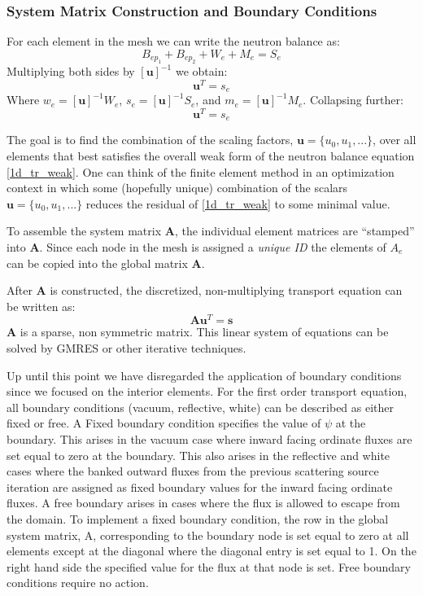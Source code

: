 \subsubsection{System Matrix Construction and Boundary Conditions}

For each element in the mesh we can write the neutron balance as:
\begin{equation}
B_{ep_1} + B_{ep_2} + W_e + M_e = S_e
\end{equation}
Multiplying both sides by $[\mathbf u]^{-1}$ we obtain:
\begin{equation}
[b_{ep_1} + b_{ep_2} + w_e + m_e] \mathbf u^T = s_e
\end{equation}
Where $w_e= [\mathbf u]^{-1}W_e $, $s_e=[\mathbf u]^{-1} S_e $, and $m_e=[\mathbf u]^{-1}M_e $.  Collapsing further:
\begin{equation}
[A_e] \mathbf u^T = s_e
\end{equation}

The goal is to find the combination of the scaling factors, $\mathbf u=\{u_0, u_1, ...\}$, over all elements that best satisfies the overall weak form of the neutron balance equation \ref{1d_tr_weak}.  One can think of the finite element method in an optimization context in which some (hopefully unique) combination of the scalars $\mathbf u =\{u_0, u_1, ...\}$ reduces the residual of \ref{1d_tr_weak} to some minimal value.
 
 To assemble the system matrix $\mathbf A$, the individual element matrices are ``stamped'' into $\mathbf A$. Since
each node in the mesh is assigned a \emph{unique ID} the elements of $A_e$ can be copied into the global matrix $\mathbf A$.

After $\mathbf A$ is constructed, the discretized, non-multiplying transport equation can be written as:
\begin{equation}
\mathbf A \mathbf u^T = \mathbf s
\end{equation}
$\mathbf A$ is a sparse, non symmetric matrix. This linear system of equations can be solved by GMRES or other iterative techniques.
 
Up until this point we have disregarded the application of boundary conditions since we focused on the interior elements.  For the first order transport equation, all boundary conditions (vacuum, reflective, white) can be
described as either fixed or free. A Fixed boundary condition specifies the value of $\psi$ at the boundary.
This arises in the vacuum case where inward facing ordinate fluxes are set equal to zero at the
boundary. This also arises in the reflective and white cases where the banked outward fluxes from the
previous scattering source iteration are assigned as fixed boundary values for the inward facing ordinate
fluxes. A free boundary arises in cases where the flux is allowed to escape from the domain.
To implement a fixed boundary condition, the row in the global system matrix, A, corresponding
to the boundary node is set equal to zero at all elements except at the diagonal where the diagonal
entry is set equal to 1. On the right hand side the specified value for the flux at that node is set.
Free boundary conditions require no action.